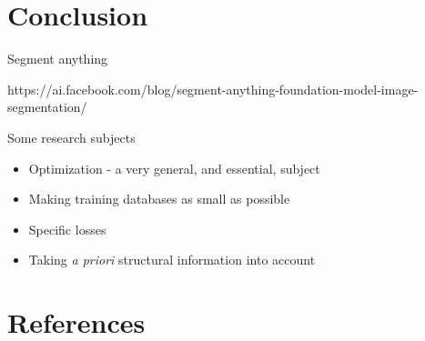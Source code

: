 \documentclass[xcolor=pdftex,dvipsnames,table,mathserif,aspectratio=169]{beamer}
\begin{document}



\section*{Conclusion}


\begin{frame}{Segment anything}


  https://ai.facebook.com/blog/segment-anything-foundation-model-image-segmentation/

\end{frame}



\begin{frame}{Some research subjects}

  \begin{itemize}
  \item Optimization - a very general, and essential, subject
  \item Making training databases as small as possible
  \item Specific losses
  \item Taking  {\it a priori} structural information into account
  \end{itemize}

\end{frame}




\section*{References}


\end{document}
